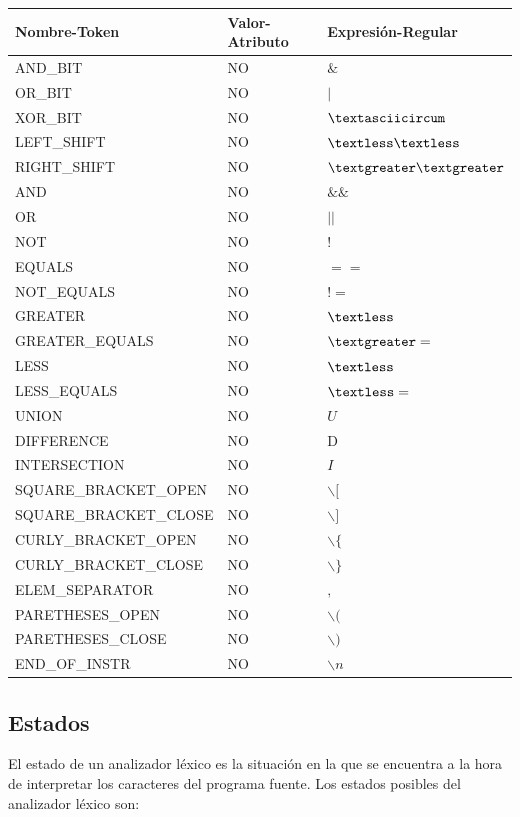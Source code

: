 \documentclass[11pt, english]{article}
\begin{document}
\begin{table}[H]
	\begin{tabular}{l|l|l}
		\toprule
		\textbf{Nombre-Token} & \textbf{Valor-Atributo} & \textbf{Expresión-Regular}\\
		\midrule
		AND\_BIT & NO & $\&$ \\
		OR\_BIT & NO & $|$  \\
		XOR\_BIT & NO & $\textasciicircum$ \\
		LEFT\_SHIFT & NO & $\textless\textless$ \\
		RIGHT\_SHIFT & NO & $\textgreater\textgreater$ \\
		AND & NO & $\&\&$ \\
		OR & NO & $||$ \\
		NOT & NO & $!$ \\
		EQUALS & NO & $==$ \\
		NOT\_EQUALS & NO & $!=$ \\
		GREATER & NO & $\textless$ \\
		GREATER\_EQUALS & NO & $\textgreater=$ \\
		LESS & NO & $\textless$ \\
		LESS\_EQUALS & NO & $\textless=$ \\
		UNION & NO & $U$ \\
		DIFFERENCE & NO & D \\
		INTERSECTION & NO & $I$ \\
		SQUARE\_BRACKET\_OPEN & NO & $\backslash [$ \\
		SQUARE\_BRACKET\_CLOSE & NO & $\backslash ]$ \\
		CURLY\_BRACKET\_OPEN & NO & $\backslash \{$ \\
		CURLY\_BRACKET\_CLOSE & NO & $\backslash \}$ \\
		ELEM\_SEPARATOR & NO & $,$ \\
		PARETHESES\_OPEN & NO & $\backslash($ \\
		PARETHESES\_CLOSE & NO & $\backslash)$ \\
		END\_OF\_INSTR & NO & $\backslash n$ \\
		\bottomrule
	\end{tabular}
\end{table}

\newpage

\subsection{Estados}\label{Estados}

El estado de un analizador léxico es la situación en la que se encuentra a la hora de interpretar los caracteres del programa fuente. Los estados posibles del analizador léxico son:
\end{document}
